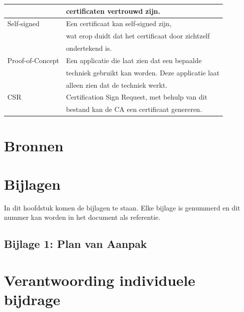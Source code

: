 \documentclass[]{article}
\begin{document}
\begin{longtable}{|| l | l ||}
                     & certificaten vertrouwd  zijn.                        \\\hline
    Self-signed      & Een certificaat kan self-signed zijn,                \\
                     & wat erop duidt dat het certificaat door zichtzelf    \\
                     & ondertekend is.                                      \\\hline
    Proof-of-Concept & Een applicatie die laat zien dat een bepaalde        \\
                     & techniek gebruikt kan worden. Deze applicatie laat   \\
                     & alleen zien dat de techniek werkt.                   \\\hline
    CSR              & Certification Sign Request, met behulp van dit       \\
                     & bestand kan de CA een certificaat genereren.         \\\hline
\end{longtable}

\newpage
\section{Bronnen}

\newpage
\section{Bijlagen}

In dit hoofdstuk komen de bijlagen te staan. Elke bijlage is genummerd en
dit nummer kan worden in het document als referentie.

\subsection{Bijlage 1: Plan van Aanpak}

\newpage
\section{Verantwoording individuele bijdrage}
\end{document}
